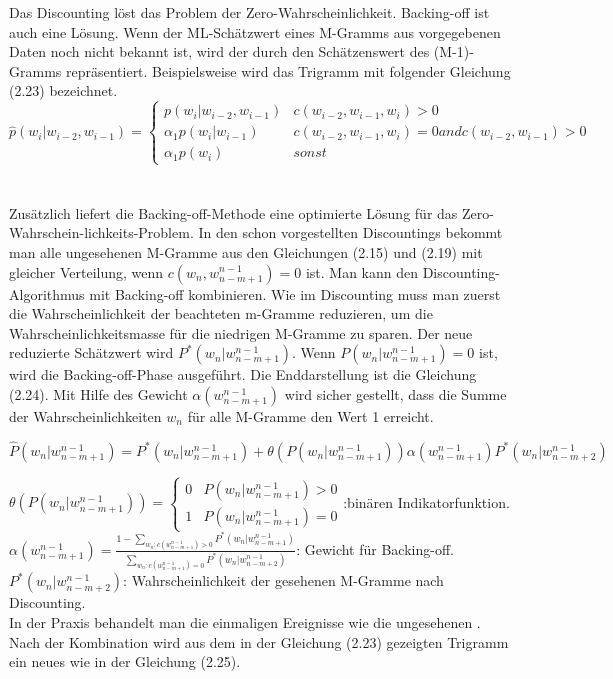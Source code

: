 Das Discounting l\"ost das Problem der Zero-Wahrscheinlichkeit. Backing-off ist auch eine L\"osung. Wenn der ML-Sch\"atzwert eines M-Gramms aus vorgegebenen Daten noch nicht bekannt ist, wird der durch den Sch\"atzenswert des (M-1)-Gramms repr\"asentiert. Beispielsweise wird das Trigramm mit folgender Gleichung (2.23) bezeichnet.
\begin{equation}
\label{equation:backing_off_01}
	\hat{p}(w_{i}|w_{i-2},w_{i-1})=
	\begin{cases}
			p(w_{i}|w_{i-2},w_{i-1}) & c(w_{i-2},w_{i-1},w_{i})>0 \\
			\alpha_{1}p(w_{i}|w_{i-1})& c(w_{i-2},w_{i-1},w_{i})=0 and c(w_{i-2},w_{i-1})>0 \\
			\alpha_{1}p(w_{i}) & sonst 
	\end{cases}
\end{equation}
\\
\\
Zus\"atzlich liefert die Backing-off-Methode eine optimierte L\"osung f\"ur das Zero-Wahrschein-lichkeits-Problem. In den schon vorgestellten Discountings bekommt man alle ungesehenen M-Gramme aus den Gleichungen (2.15) und (2.19) mit gleicher Verteilung, wenn $c(w_{n},w_{n-m+1}^{n-1})=0$ ist. Man kann den Discounting-Algorithmus mit Backing-off kombinieren. Wie im Discounting muss man zuerst die Wahrscheinlichkeit der beachteten m-Gramme reduzieren, um die Wahrscheinlichkeitsmasse f\"ur die niedrigen M-Gramme zu sparen. Der neue  reduzierte Sch\"atzwert wird $P^{*}(w_{n}|w_{n-m+1}^{n-1})$. Wenn $P(w_{n}|w_{n-m+1}^{n-1})=0$ ist, wird die Backing-off-Phase ausgef\"uhrt.  Die Enddarstellung ist die Gleichung (2.24).  Mit  Hilfe des Gewicht $\alpha(w_{n-m+1}^{n-1})$ wird sicher gestellt, dass die Summe der Wahrscheinlichkeiten $w_{n}$ f\"ur alle M-Gramme den Wert 1 erreicht.

\begin{equation}
\label{equation:backing_off_02}
\hat{P}(w_{n}|w_{n-m+1}^{n-1})=P^{*}(w_{n}|w_{n-m+1}^{n-1})+\theta(P(w_{n}|w_{n-m+1}^{n-1}))\alpha(w_{n-m+1}^{n-1})P^{*}(w_{n}|w_{n-m+2}^{n-1})
\end{equation}

$\theta(P(w_{n}|w_{n-m+1}^{n-1}))=\begin{cases} 0 & P(w_{n}|w_{n-m+1}^{n-1})>0 \\ 1 & P(w_{n}|w_{n-m+1}^{n-1})= 0 \end{cases}$:bin\"aren Indikatorfunktion.\\
$\alpha(w_{n-m+1}^{n-1})=\frac{1-\sum_{w_{n}:c(w_{n-m+1}^{n-1})>0}P^{*}(w_{n}|w_{n-m+1}^{n-1})}{\sum_{w_{n}:c(w_{n-m+1}^{n-1})=0}P^{*}(w_{n}|w_{n-m+2}^{n-1})}$: Gewicht f\"ur Backing-off.\\
$P^{*}(w_{n}|w_{n-m+2}^{n-1})$: Wahrscheinlichkeit der gesehenen M-Gramme nach Discounting.\\
In der Praxis behandelt man die einmaligen Ereignisse wie die ungesehenen . Nach der Kombination wird aus dem in der Gleichung (2.23) gezeigten Trigramm ein neues wie in der Gleichung (2.25).

